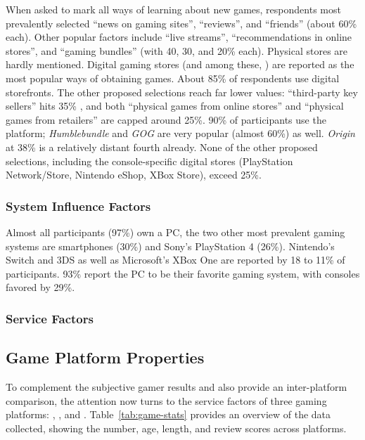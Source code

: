 When asked to mark all ways of learning about new games, respondents
most prevalently selected ``news on gaming sites'', ``reviews'', and
``friends'' (about 60\% each). Other popular factors include
``live streams'', ``recommendations in online stores'', and
``gaming bundles'' (with 40, 30, and 20\% each). Physical stores
are hardly mentioned.
Digital gaming stores (and among these, \steam) are reported as
the most popular ways of obtaining games. About 85\% of respondents
use digital storefronts. The other proposed selections reach far lower
values: ``third-party key sellers'' hits 35\% , and both ``physical
games from online stores'' and ``physical games from retailers''
are capped around 25\%.
90\% of participants use the \steam platform; \textit{Humblebundle}
and \textit{GOG} are very popular (almost 60\%) as well. \textit{Origin}
at 38\% is a relatively distant fourth already. None of the other
proposed selections, including the console-specific digital stores
(PlayStation Network/Store, Nintendo eShop, XBox Store), exceed
25\%.


\subsubsection{System Influence Factors}
Almost all participants (97\%) own a PC, the two other most prevalent
gaming systems are smartphones (30\%) and Sony's PlayStation 4 (26\%).
Nintendo's Switch and 3DS as well as Microsoft's XBox One are reported
by 18 to 11\% of participants.
93\% report the PC to be their favorite gaming system, with consoles
favored by 29\%.



\subsubsection{Service Factors}

\subsection{Game Platform Properties}\label{subsec:platformproperties}

To complement the subjective gamer results and also provide an
inter-platform comparison, the attention now turns to the service
factors of three gaming platforms: \steam, \gfnow, and \psnow.
Table~\ref{tab:game-stats} provides an overview of the data
collected, showing the number, age, length, and review scores
across platforms.

